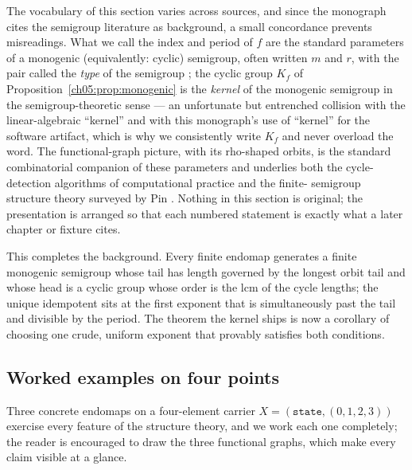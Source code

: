 \begin{remark}
\label{ch05:rem:terminology}
The vocabulary of this section varies across sources, and since the
monograph cites the semigroup literature as background, a small
concordance prevents misreadings. What we call the index and period of
$f$ are the standard parameters of a monogenic (equivalently: cyclic)
semigroup, often written $m$ and $r$, with the pair called the
\emph{type} of the semigroup \cite{howie}; the cyclic group $K_f$ of
Proposition~\ref{ch05:prop:monogenic} is the \emph{kernel} of the
monogenic semigroup in the semigroup-theoretic sense --- an unfortunate
but entrenched collision with the linear-algebraic ``kernel'' and with
this monograph's use of ``kernel'' for the software artifact, which is
why we consistently write $K_f$ and never overload the word. The
functional-graph picture, with its rho-shaped orbits, is the standard
combinatorial companion of these parameters and underlies both the
cycle-detection algorithms of computational practice and the finite-
semigroup structure theory surveyed by Pin \cite{pin}. Nothing in this
section is original; the presentation is arranged so that each numbered
statement is exactly what a later chapter or fixture cites.
\end{remark}

This completes the background. Every finite endomap generates a finite
monogenic semigroup whose tail has length governed by the longest orbit
tail and whose head is a cyclic group whose order is the lcm of the cycle
lengths; the unique idempotent sits at the first exponent that is
simultaneously past the tail and divisible by the period. The theorem the
kernel ships is now a corollary of choosing one crude, uniform exponent
that provably satisfies both conditions.

\subsection{Worked examples on four points}
\label{ch05:sec:worked}

Three concrete endomaps on a four-element carrier
$X = (\texttt{state}, (0, 1, 2, 3))$ exercise every feature of the
structure theory, and we work each one completely; the reader is
encouraged to draw the three functional graphs, which make every claim
visible at a glance.


